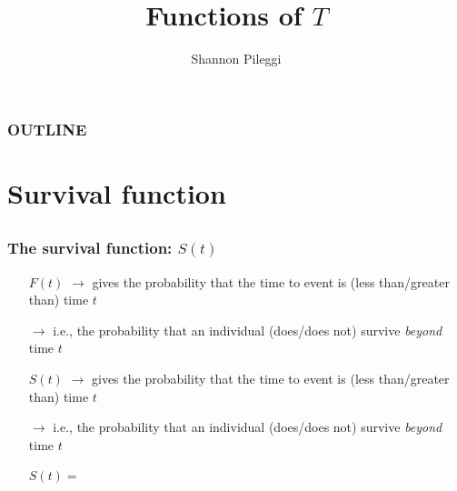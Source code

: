 



\title[Set 2]{Functions of $T$}
\author[Pileggi]{Shannon Pileggi}


\date{}




\begin{frame}
\titlepage
\end{frame}

\begin{frame}
\frametitle{OUTLINE\qquad\qquad\qquad} \tableofcontents[hideallsubsections]
\end{frame}


\section[Survival function]{Survival function}

\subsection{}

\begin{frame}
\frametitle{The survival function: $S(t)$}

\begin{itemize}
\item[$F(t)$] $\rightarrow$ gives the probability that the time to event is (less than/greater than) time $t$ %
\item[] $\rightarrow$ i.e., the probability that an individual  (does/does not) survive \emph{beyond} time $t$ %
\item[]
\item[$S(t)$] $\rightarrow$ gives the probability that the time to event is (less than/greater than) time $t$  %
\item[] $\rightarrow$ i.e., the probability that an individual (does/does not) survive \emph{beyond} time $t$ %
\item[]
\item[$S(t) = $]
\item[]
\item[]
\end{itemize}
\end{frame}




